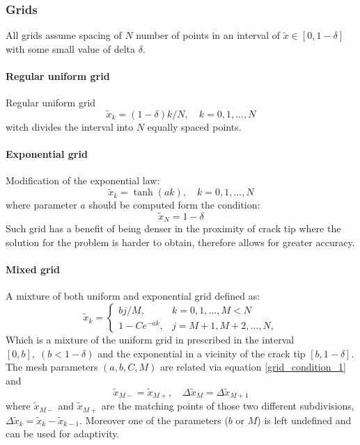 \subsubsection{Grids}
All grids assume spacing of $N$ number of points in an interval of $\tilde x \in [0,1-\delta]$ with some small value of delta $\delta$.

\paragraph{Regular uniform grid}
Regular uniform grid 
\begin{equation}
\tilde x_k = (1-\delta)k/N,\quad k=0,1,...,N
\end{equation}
witch divides the interval into $N$ equally spaced points.
\paragraph{Exponential grid}
Modification of the exponential law:
\begin{equation}
\tilde x_k =\tanh(ak), \quad k=0,1,...,N
\end{equation}
where parameter $a$ should be computed form the condition:
\begin{equation}\label{grid_condition_1}
\tilde x_N=1-\delta
\end{equation}
Such grid has a benefit of being denser in the proximity of crack tip where the solution for the problem is harder to obtain, therefore allows for greater accuracy.
\paragraph{Mixed grid}
A mixture of both uniform and exponential grid defined as:
 \begin{equation}
   \tilde x_k = \left\{
     \begin{array}{cl}
       bj/M, & k=0,1,...,M<N\\
       1-Ce^{-ak}, & j=M+1,M+2,...,N,
     \end{array}
   \right.
\end{equation} 
Which is a mixture of the uniform grid in prescribed in the interval $[0,b],\; (b<1-\delta)$ and the exponential in a vicinity of the crack tip $[b,1-\delta]$. The mesh parameters $(a,b,C,M)$ are related via equation \eqref{grid_condition_1} and 
\begin{equation}
\tilde x_{M-}=\tilde x_{M+},\quad \Delta \tilde x_{M}=\Delta \tilde x_{M+1}
\end{equation} 
where $\tilde x_{M-}$ and $\tilde x_{M+}$ are the matching points of those two different subdivisions, $\Delta \tilde x_k = \tilde x_k -\tilde x_{k-1}$. Moreover one of the parameters ($b$ or $M$) is left undefined and can be used for adaptivity.

